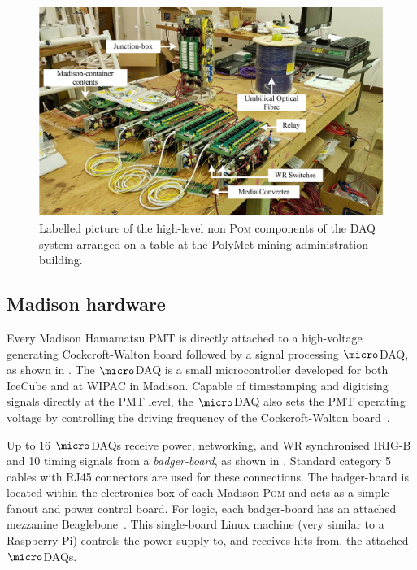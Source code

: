 \begin{figure} %
    \includegraphics[width=\textwidth]{diagrams/5-daq/full_setup.pdf}
    \caption[Labelled picture of the high-level components of the \chipsfive DAQ system]
    {Labelled picture of the high-level non \textsc{Pom} components of the \chipsfive DAQ system
        arranged on a table at the PolyMet mining administration building.}
    \label{fig:full_setup}
\end{figure}

\subsection{Madison hardware} %
\label{sec:daq_hard_madison} %

Every Madison Hamamatsu PMT is directly attached to a high-voltage generating Cockcroft-Walton
board followed by a signal processing $\micro$DAQ, as shown in
. The $\micro$DAQ is a small microcontroller developed for
both IceCube and \chips at WIPAC in Madison. Capable of timestamping and digitising signals
directly at the PMT level, the $\micro$DAQ also sets the PMT operating voltage by controlling the
driving frequency of the Cockcroft-Walton board~\cite{eijk2018}.

Up to 16 $\micro$DAQs receive power, networking, and WR synchronised IRIG-B and
\unit{10}{} timing signals from a \emph{badger-board}, as shown in
. Standard category 5 cables with RJ45 connectors are used for these
connections. The badger-board is located within the electronics box of each Madison \textsc{Pom}
and acts as a simple fanout and power control board. For logic, each badger-board has an attached
mezzanine Beaglebone~\cite{beagle2020}. This single-board Linux machine (very similar to a
Raspberry Pi) controls the power supply to, and receives hits from, the attached $\micro$DAQs.

